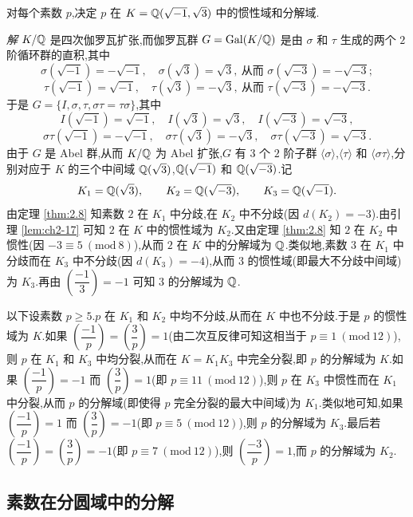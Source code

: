 \begin{example}\label{ex:ch2-s3-3-1}
对每个素数 $p$,决定 $p$ 在 $K=\mathbb{Q}(\sqrt{-1},\sqrt{3})$ 中的惯性域和分解域.

\emph{解} $K/\mathbb{Q}$ 是四次伽罗瓦扩张,而伽罗瓦群 $G=\operatorname{Gal}(K/\mathbb{Q})$ 是由 $\sigma$ 和 $\tau$ 生成的两个 $2$ 阶循环群的直积,其中
\[
  \sigma(\sqrt{-1})=-\sqrt{-1},\quad \sigma(\sqrt{3})=\sqrt{3},\ \text{从而 }\sigma(\sqrt{-3})=-\sqrt{-3};
\]
\[
  \tau(\sqrt{-1})=\sqrt{-1},\quad \tau(\sqrt{3})=-\sqrt{3},\ \text{从而 }\tau(\sqrt{-3})=-\sqrt{-3}.
\]
于是 $G=\{I,\sigma,\tau,\sigma\tau=\tau\sigma\}$,其中
\[
  I(\sqrt{-1})=\sqrt{-1},\quad I(\sqrt{3})=\sqrt{3},\quad I(\sqrt{-3})=\sqrt{-3},
\]
\[
  \sigma\tau(\sqrt{-1})=-\sqrt{-1},\quad \sigma\tau(\sqrt{3})=-\sqrt{3},\quad \sigma\tau(\sqrt{-3})=\sqrt{-3}.
\]
由于 $G$ 是 Abel 群,从而 $K/\mathbb{Q}$ 为 Abel 扩张,$G$ 有 $3$ 个 $2$ 阶子群 $\langle\sigma\rangle$,$\langle\tau\rangle$ 和 $\langle\sigma\tau\rangle$,分别对应于 $K$ 的三个中间域 $\mathbb{Q}(\sqrt{3})$,$\mathbb{Q}(\sqrt{-1})$ 和 $\mathbb{Q}(\sqrt{-3})$.记
\[
  K_1=\mathbb{Q}(\sqrt{3}),\qquad K_2=\mathbb{Q}(\sqrt{-3}),\qquad K_3=\mathbb{Q}(\sqrt{-1}).
\]
由定理 \ref{thm:2.8} 知素数 $2$ 在 $K_1$ 中分歧,在 $K_2$ 中不分歧(因 $d(K_2)=-3$).由引理 \ref{lem:ch2-17} 可知 $2$ 在 $K$ 中的惯性域为 $K_2$.又由定理 \ref{thm:2.8} 知 $2$ 在 $K_2$ 中惯性(因 $-3\equiv 5\ (\mathrm{mod}\ 8)$),从而 $2$ 在 $K$ 中的分解域为 $\mathbb{Q}$.类似地,素数 $3$ 在 $K_1$ 中分歧而在 $K_3$ 中不分歧(因 $d(K_3)=-4$),从而 $3$ 的惯性域(即最大不分歧中间域)为 $K_3$.再由 $\left(\dfrac{-1}{3}\right)=-1$ 可知 $3$ 的分解域为 $\mathbb{Q}$.

以下设素数 $p\geqslant 5$.$p$ 在 $K_1$ 和 $K_2$ 中均不分歧,从而在 $K$ 中也不分歧.于是 $p$ 的惯性域为 $K$.如果 $\left(\dfrac{-1}{p}\right)=\left(\dfrac{3}{p}\right)=1$(由二次互反律可知这相当于 $p\equiv 1\ (\mathrm{mod}\ 12)$),则 $p$ 在 $K_1$ 和 $K_3$ 中均分裂,从而在 $K=K_1K_3$ 中完全分裂,即 $p$ 的分解域为 $K$.如果 $\left(\dfrac{-1}{p}\right)=-1$ 而 $\left(\dfrac{3}{p}\right)=1$(即 $p\equiv 11\ (\mathrm{mod}\ 12)$),则 $p$ 在 $K_3$ 中惯性而在 $K_1$ 中分裂,从而 $p$ 的分解域(即使得 $p$ 完全分裂的最大中间域)为 $K_1$.类似地可知,如果 $\left(\dfrac{-1}{p}\right)=1$ 而 $\left(\dfrac{3}{p}\right)=-1$(即 $p\equiv 5\ (\mathrm{mod}\ 12)$),则 $p$ 的分解域为 $K_3$.最后若 $\left(\dfrac{-1}{p}\right)=\left(\dfrac{3}{p}\right)=-1$(即 $p\equiv 7\ (\mathrm{mod}\ 12)$),则 $\left(\dfrac{-3}{p}\right)=1$,而 $p$ 的分解域为 $K_2$.
\end{example}

\subsection{素数在分圆域中的分解}\label{sec:ch2-s3-4}

